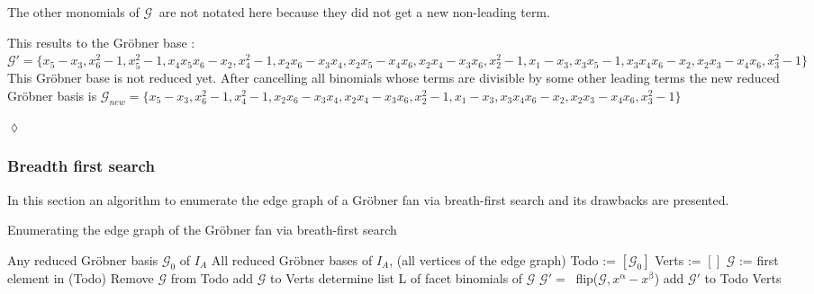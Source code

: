 \begin{env_example}
The other monomials of $\mathcal{G}~$ are not notated here because they did not get a new non-leading term.

This results to the Gröbner base : \\
$\mathcal{G}' = \{x_{5}-x_{3}, x_{6}^{2}-1, x_{5}^{2}-1, x_{4}x_{5}x_{6}-x_{2}, x_{4}^{2}-1, x_{2}x_{6}-x_{3}x_{4},
x_{2}x_{5}-x_{4}x_{6}, x_{2}x_{4}-x_{3}x_{6} ,x_{2}^{2}-1,x_{1}-x_{3},x_{3}x_{5}-1,x_{3}x_{4}x_{6}-x_{2},x_{2}x_{3}-x_{4}x_{6},x_{3}^{2}-1   \}$ \\
This Gröbner base is not reduced yet. After cancelling all binomials whose terms are divisible by some other leading terms the new reduced Gröbner basis is 
$\mathcal{G}_{new} = \{x_{5}-x_{3},x_{6}^{2}-1,x_{4}^{2}-1,x_{2}x_{6}-x_{3}x_{4},x_{2}x_{4}-x_{3}x_{6},x_{2}^{2}-1,x_{1}-x_{3}, x_{3}x_{4}x_{6}-x_{2},x_{2}x_{3}-x_{4}x_{6},x_{3}^{2}-1 \} $

\begin{flushright}
$\lozenge$
\end{flushright}
\end{env_example}


\subsubsection{Breadth first search}

In this section an algorithm to enumerate the edge graph of a Gröbner fan via breath-first search and its drawbacks are presented.

\begin{algorithm}
\caption{Enumerating the edge graph of the Gröbner fan via breath-first search \cite{tigers}}
\label{alg:breath}
\begin{algorithmic}[1]

\Input
Any reduced Gröbner basis $ \mathcal{G}_0 $ of $I_A$
\Output All reduced Gröbner bases of $I_A$, (all vertices of the edge graph)
\State Todo := $\left[ \mathcal{G}_0 \right]  $
\State Verts := $\left[ \right] $
\State $\mathcal{G}$ := first element in (Todo)
\State Remove $\mathcal{G} $ from Todo
\State add $\mathcal{G}$ to Verts 
\State determine list L of facet binomials of $\mathcal{G} $
 \State $\mathcal{G}' =~$ flip($\mathcal{G},x^{\upalpha} - x^{\upbeta} $)
 \State add $\mathcal{G}'$ to Todo
 \EndIf
 \EndFor
\EndWhile 
\Return Verts

\end{algorithmic}
\end{algorithm}

